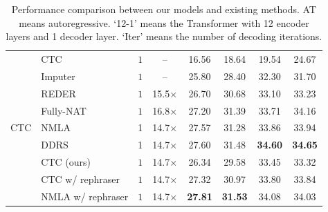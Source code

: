 \documentclass[letterpaper]{article} %
\begin{document}
\begin{table}[th!]
\begin{tabular}{clcccccc}
\multirow{9}{*}{CTC}
& CTC \cite{libovicky2018end}  &$1$&--& 16.56 & 18.64 & 19.54 & 24.67  \\
& Imputer \cite{saharia-etal-2020-non}  &$1$&--& 25.80 & 28.40 & 32.30 & 31.70 \\
& REDER \cite{zheng2021duplex}  &$1$&15.5$\times$&26.70 & 30.68 & 33.10 & 33.23\\
& Fully-NAT \cite{gu2020fully}  &$1$&16.8$\times$& 27.20 & 31.39 & 33.71 & 34.16\\
& NMLA \cite{nmla}& 1 & 14.7$\times$& 27.57 & 31.28 & 33.86 & 33.94\\
& DDRS \cite{shao-etal-2022-one}& 1 & 14.7$\times$&27.60&31.48&\bf{34.60}&\bf{34.65}\\
& CTC (ours) &$1$&14.7$\times$&26.34 & 29.58 & 33.45 & 33.32\\
& CTC w/ rephraser &$1$&14.7$\times$& 27.32& 30.97&33.80 &33.84 \\
& NMLA w/ rephraser &$1$&14.7$\times$& \bf{27.81}& \bf{31.53}&34.08 &34.03 \\
\bottomrule
\end{tabular}
\caption{Performance comparison between our models and existing methods. AT means autoregressive. `12-1' means the Transformer with 12 encoder layers and 1 decoder layer. `Iter' means the number of decoding iterations.}
\label{tab:main-rst}
\end{table}
\end{document}
